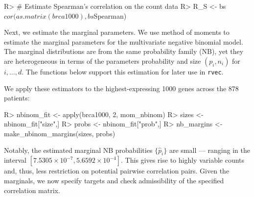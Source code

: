 \documentclass[
]{jss}
\begin{document}
\begin{CodeChunk}
\begin{CodeInput}
R> # Estimate Spearman's correlation on the count data
R> R_S <- bs$cor(as.matrix(brca1000), bs$Spearman)
\end{CodeInput}
\end{CodeChunk}

Next, we estimate the marginal parameters. We use method of moments to estimate the marginal parameters for the multivariate negative binomial model. The marginal distributions are from the same probability family (NB), yet they are heterogeneous in terms of the parameters probability and size \((p_i, n_i)\) for \(i,\ldots,d\). The functions below support this estimation for later use in \texttt{rvec}.

\begin{CodeChunk}
\end{CodeChunk}

We apply these estimators to the highest-expressing 1000 genes across the 878 patients:

\begin{CodeChunk}
\begin{CodeInput}
R> nbinom_fit <- apply(brca1000, 2, mom_nbinom)
R> sizes <- nbinom_fit["size",]
R> probs <- nbinom_fit["prob",]
R> nb_margins <- make_nbinom_margins(sizes, probs)
\end{CodeInput}
\end{CodeChunk}

Notably, the estimated marginal NB probabilities \(\{ \hat{p}_i \}\) are small --- ranging in the interval \([\ensuremath{7.5305\times 10^{-7}} , \ensuremath{5.6592\times 10^{-4}}]\). This gives rise to highly variable counts and, thus, less restriction on potential pairwise correlation pairs. Given the marginals, we now specify targets and check admissibility of the specified correlation matrix.
\end{document}
